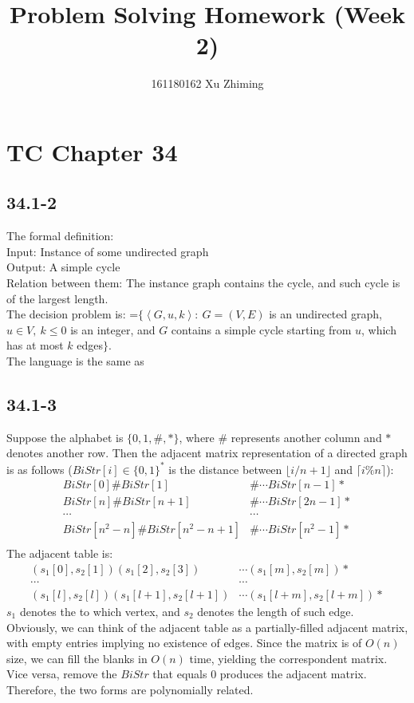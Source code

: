 \documentclass[twocolumn, 10.5pt]{article}
\begin{document}
	\title{Problem Solving Homework (Week 2)}\author{161180162 Xu Zhiming}\maketitle
	\section*{TC Chapter 34}
	\subsection*{34.1-2}
	The formal definition:\\
	Input: Instance of some undirected graph\\
	Output: A simple cycle\\
	Relation between them: The instance graph contains the cycle, and such cycle is of the largest length.\\
	The decision problem is: =$\{\left\langle G,u,k\right\rangle:\ G=(V,E)$ is an undirected graph, $u\in V,\ k\le 0$ is an integer, and $G$ contains a simple cycle starting from $u$, which has at most $k$ edges$\}$.\\
	The language is the same as 
	\subsection*{34.1-3}
	Suppose the alphabet is $\{0,1,\#,*\}$, where $\#$ represents another column and $*$ denotes another row. Then the adjacent matrix representation of a directed graph is as follows ($BiStr[i]\in\{0,1\}^*$ is the distance between $\lfloor i/n+1\rfloor$ and $\lceil i\%n\rceil$):
	\[
	\begin{aligned}
	BiStr[0]\#BiStr[1]&\#\cdots BiStr[n-1]*\\
	BiStr[n]\#BiStr[n+1]&\#\cdots BiStr[2n-1]*\\
	\cdots&\cdots\\
	BiStr[n^2-n]\#BiStr[n^2-n+1]&\#\cdots BiStr[n^2-1]*\\
	\end{aligned}
	\]
	The adjacent table is:
	\[
	\begin{aligned}
	(s_1[0],s_2[1])(s_1[2],s_2[3])&\cdots (s_1[m],s_2[m])*\\
	\cdots&\cdots\\
	(s_1[l],s_2[l])(s_1[l+1],s_2[l+1])&\cdots (s_1[l+m],s_2[l+m])*
	\end{aligned}
	\]
	$s_1$ denotes the to which vertex, and $s_2$ denotes the length of such edge.\\
	Obviously, we can think of the adjacent table as a partially-filled adjacent matrix, with empty entries implying no existence of edges. Since the matrix is of $O(n)$ size, we can fill the blanks in $O(n)$ time, yielding the correspondent matrix. Vice versa, remove the $BiStr$ that equals $0$ produces the adjacent matrix. Therefore, the two forms are polynomially related.  
\end{document}

